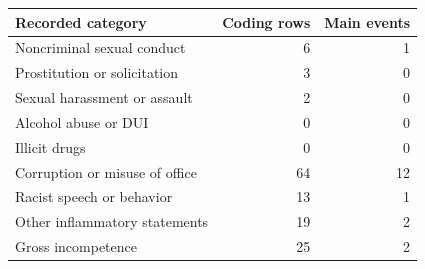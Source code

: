 \begin{tabular}{lrr}
\toprule
Recorded category & Coding rows & Main events \\
\midrule
Noncriminal sexual conduct &  6 &  1 \\
Prostitution or solicitation &  3 &  0 \\
Sexual harassment or assault &  2 &  0 \\
Alcohol abuse or DUI &  0 &  0 \\
Illicit drugs &  0 &  0 \\
Corruption or misuse of office & 64 & 12 \\
Racist speech or behavior & 13 &  1 \\
Other inflammatory statements & 19 &  2 \\
Gross incompetence & 25 &  2 \\
\bottomrule
\end{tabular}
